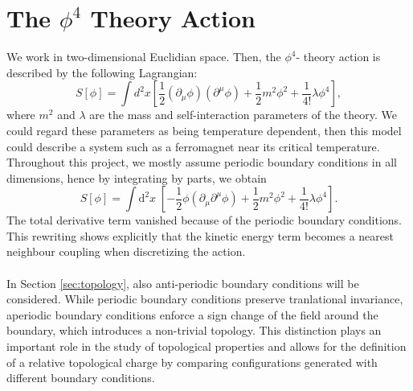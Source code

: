 \section{The \texorpdfstring{$\phi^4$}{phi4} Theory Action}
We work in two-dimensional Euclidian space. Then, the $\phi^4$- theory action is described by the following Lagrangian:
\begin{equation}
    S[\phi] = \int d^2x \left[ \frac{1}{2}(\partial_\mu \phi) (\partial^\mu \phi) + \frac{1}{2} m^2 \phi^2 + \frac{1}{4!}\lambda \phi^4 \right], 
\end{equation} 
where $m^2$ and $\lambda$ are the mass and self-interaction parameters of the theory. We could regard these parameters as being temperature dependent, then this model could describe a system such as a ferromagnet near its critical temperature.\\
Throughout this project, we mostly assume periodic boundary conditions in all dimensions, hence by integrating by parts, we obtain
\begin{equation}
    S[\phi] = \int \mathrm{d}^{2}x \;  \left[ -\frac{1}{2} \phi \left( \partial_{\mu} \partial^{\mu} \phi \right) + \frac{1}{2} m^{2} \phi^{2} + \frac{1}{4!} \lambda \phi^{4} \right].
\end{equation}
The total derivative term vanished because of the periodic boundary conditions. This rewriting shows explicitly that the kinetic energy term becomes a nearest neighbour coupling when discretizing the action. \\\\
In Section \ref{sec:topology}, also anti-periodic boundary conditions will be considered. While periodic boundary conditions preserve tranlational invariance, aperiodic boundary conditions enforce a sign change of the field around the boundary, which introduces a non-trivial topology. This distinction plays an important role in the study of topological properties and allows for the definition of a relative topological charge by comparing configurations generated with different boundary conditions.
